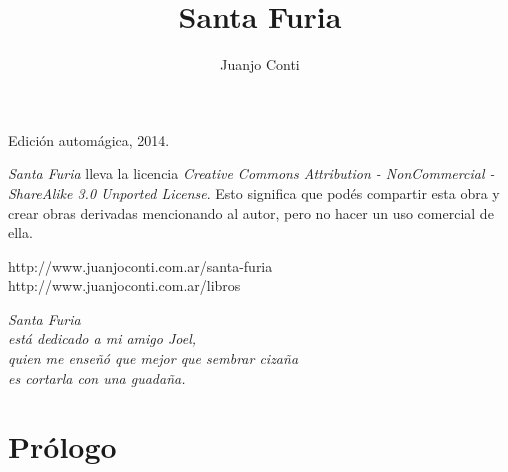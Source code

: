 \documentclass[12pt,twoside,openright,a5paper]{book}
\title{Santa Furia}
\author{Juanjo Conti}
\date{}
\begin{document}
\pagestyle{plain}

\maketitle


\thispagestyle{empty}
\noindent
Edición automágica, 2014.\\

\vspace{0.5cm}

\noindent
\emph{Santa Furia} lleva la licencia 
\emph{Creative Commons Attribution - NonCommercial - ShareAlike 3.0 Unported License}.
Esto significa que podés compartir esta obra y crear obras derivadas
mencionando al autor, pero no ha\-cer un uso comercial de ella.

\vfill

\noindent
http://www.juanjoconti.com.ar/santa-furia\\

\noindent
http://www.juanjoconti.com.ar/libros

\cleardoublepage

\noindent
\begin{flushright}
\emph{
\emph{Santa Furia}\\
está dedicado a mi amigo Joel,\\
quien me enseñó que mejor que sembrar cizaña\\
es cortarla con una guadaña.
}
\end{flushright}

\cleardoublepage

\renewcommand*\contentsname{Índice}

\tableofcontents

\chapter*{Prólogo}

\end{document}
